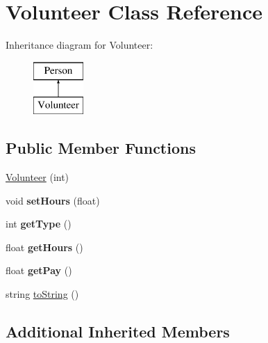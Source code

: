 \hypertarget{class_volunteer}{\section{Volunteer Class Reference}
\label{class_volunteer}
}
Inheritance diagram for Volunteer\+:\begin{figure}[H]
\begin{center}
\leavevmode
\includegraphics[height=2.000000cm]{class_volunteer}
\end{center}
\end{figure}
\subsection*{Public Member Functions}
\begin{DoxyCompactItemize}
\item 
\hyperlink{class_volunteer_a33cb19b8511035c139c6015eef4a20d3}{Volunteer} (int)
\item 
\hypertarget{class_volunteer_a927b7a0d08617bc1fc8227a8eed97904}{void {\bfseries set\+Hours} (float)}\label{class_volunteer_a927b7a0d08617bc1fc8227a8eed97904}

\item 
\hypertarget{class_volunteer_a855153a69c8ab88048e7f51a5f837c7a}{int {\bfseries get\+Type} ()}\label{class_volunteer_a855153a69c8ab88048e7f51a5f837c7a}

\item 
\hypertarget{class_volunteer_a8fa1b19a352f0c96a2de4e98960f6a6e}{float {\bfseries get\+Hours} ()}\label{class_volunteer_a8fa1b19a352f0c96a2de4e98960f6a6e}

\item 
\hypertarget{class_volunteer_a8df05e8e35d2f0c31fe64ea7803b3620}{float {\bfseries get\+Pay} ()}\label{class_volunteer_a8df05e8e35d2f0c31fe64ea7803b3620}

\item 
string \hyperlink{class_volunteer_aa5dcc7c3680a1690edbb0ee36dbb002b}{to\+String} ()
\end{DoxyCompactItemize}
\subsection*{Additional Inherited Members}


